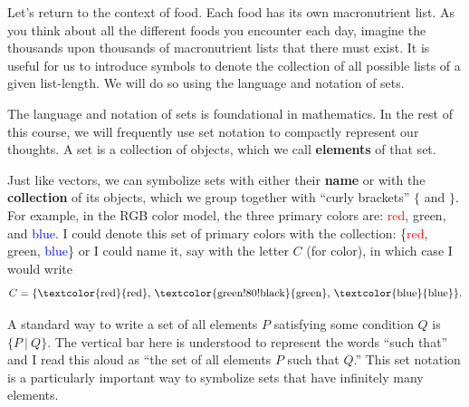 

\newpage



Let's return to the context of food.
Each food has its own macronutrient list.  
As you think about all the different foods you encounter each day, imagine the thousands upon thousands of macronutrient lists that there must exist.
It is useful for us to introduce symbols to denote the collection of all possible lists of a given list-length.  
We will do so using the language and notation of sets.

The language and notation of sets is foundational in mathematics.  
In the rest of this course, we will frequently use set notation to compactly represent our thoughts.
A set is a collection of objects, which we call \textbf{elements} of that set.  

Just like vectors, we can symbolize sets with either their \textbf{name} or with the \textbf{collection} of its objects, which we group together with ``curly brackets'' $\{$ and $\}$.  
For example, in the RGB color model, the three primary colors are: \textcolor{red}{red}, \textcolor{green!80!black}{green}, and \textcolor{blue}{blue}.  
I could denote this set of primary colors with the collection: \{\textcolor{red}{red}, \textcolor{green!80!black}{green}, \textcolor{blue}{blue}\} or I could name it, say with the letter $C$ (for color), in which case I would write
$$C = \{\mbox{\textcolor{red}{red}, \textcolor{green!80!black}{green}, \textcolor{blue}{blue}}\}.$$


A standard way to write a set of all elements $P$ satisfying some condition $Q$ is $\{P \ | \ Q\}$.  
The vertical bar here is understood to represent the words ``such that'' and I read this aloud as ``the set of all elements $P$ such that $Q$.''  
This set notation is a particularly important way to symbolize sets that have infinitely many elements.
\label{notation:set}

